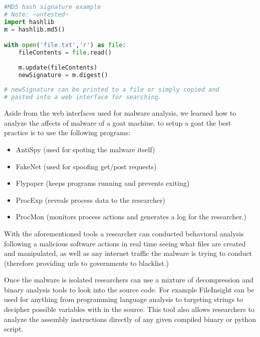 \documentclass[letterpaper,12pt,titlepage,onecolumn]{IEEEtran}
\begin{document}
\begin{lstlisting}[language=Python]
#MD5 hash signature example
# Note: ~untested~
import hashlib
m = hashlib.md5()

with open('file.txt','r') as file:
    fileContents = file.read()
    
    m.update(fileContents)
    newSignature = m.digest()
    
# newSignature can be printed to a file or simply copied and 
# pasted into a web interface for searching.
\end{lstlisting}

Aside from the web interfaces used for malware analysis, we learned how to analyze the affects of malware of a goat machine. to setup a goat the best practice is to use the following programs:
\begin{itemize}
    \item AntiSpy (used for spoting the malware itself)
    \item FakeNet (used for spoofing get/post requests)
    \item Flypaper (keeps programs running and prevents exiting)
    \item ProcExp (reveals process data to the researcher)
    \item ProcMon (monitors process actions and generates a log for the researcher.)
\end{itemize}

With the aforementioned tools a researcher can conducted behavioral analysis following a malicious software actions in real time seeing what files are created and manipulated, as well as any internet traffic the malware is trying to conduct (therefore providing urls to governments to blacklist.)\par

Once the malware is isolated researchers can use a mixture of decompression and binary analysis tools to look into the source code. For example FileInsight can be used for anything from programming language analysis to targeting strings to decipher possible variables with in the source. This tool also allows researchers to analyze the assembly instructions directly of any given compiled binary or python script.



  
%
%
\end{document}
